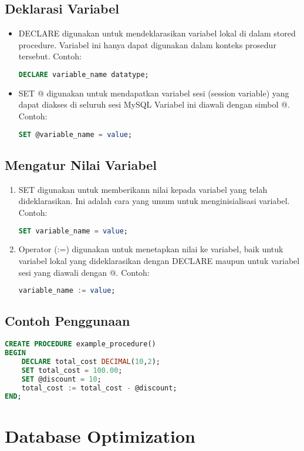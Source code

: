 \documentclass{article}
\begin{document}
\subsection{Deklarasi Variabel}
\begin{itemize}
    \item DECLARE digunakan untuk mendeklarasikan variabel lokal di dalam stored procedure. Variabel ini hanya dapat digunakan dalam konteks prosedur tersebut. Contoh:
          \begin{lstlisting}[language=SQL, caption={}, captionpos=b]
    DECLARE variable_name datatype;
    \end{lstlisting}
    \item SET @ digunakan untuk mendapatkan variabel sesi (session variable) yang dapat diakses di seluruh sesi MySQL Variabel ini diawali dengan simbol @. Contoh:
          \begin{lstlisting}[language=SQL, caption={}, captionpos=b]
    SET @variable_name = value;
    \end{lstlisting}
\end{itemize}

\subsection{Mengatur Nilai Variabel}
\begin{enumerate}
    \item SET digunakan untuk memberikann nilai kepada variabel yang telah dideklarasikan. Ini adalah cara yang umum untuk menginisialisasi variabel. Contoh:
          \begin{lstlisting}[language=SQL, caption={}, captionpos=b]
    SET variable_name = value;
    \end{lstlisting}
    \item Operator (:=) digunakan untuk menetapkan nilai ke variabel, baik untuk variabel lokal yang dideklarasikan dengan DECLARE maupun untuk variabel sesi yang diawali dengan @. Contoh:
          \begin{lstlisting}[language=SQL, caption={}, captionpos=b]
    variable_name := value;
    \end{lstlisting}
\end{enumerate}

\subsection{Contoh Penggunaan}
\begin{lstlisting}[language=SQL, caption={}, captionpos=b]
CREATE PROCEDURE example_procedure()
BEGIN
    DECLARE total_cost DECIMAL(10,2);
    SET total_cost = 100.00;
    SET @discount = 10;
    total_cost := total_cost - @discount;
END;
\end{lstlisting}

\section{Database Optimization}
\end{document}

